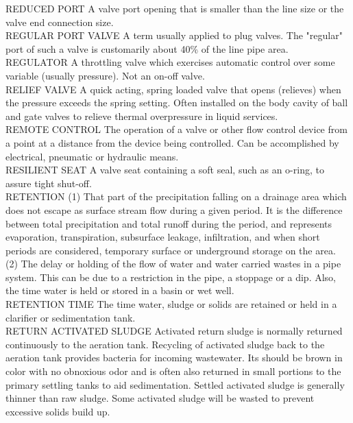 \documentclass{article}
\begin{document}
REDUCED PORT
A valve port opening that is smaller than the line size or the valve end connection size.
\vspace{0.3cm}\\
REGULAR PORT VALVE
A term usually applied to plug valves. The "regular" port of such a valve is customarily about 40\% of the line pipe area.
\vspace{0.3cm}\\
REGULATOR
A throttling valve which exercises automatic control over some variable (usually pressure). Not an on-off valve.
\vspace{0.3cm}\\
RELIEF VALVE
A quick acting, spring loaded valve that opens (relieves) when the pressure exceeds the spring setting. Often installed on the body cavity of ball and gate valves to relieve thermal overpressure in liquid services.
\vspace{0.3cm}\\
REMOTE CONTROL
The operation of a valve or other flow control device from a point at a distance from the device being controlled. Can be accomplished by electrical, pneumatic or hydraulic means.
\vspace{0.3cm}\\
RESILIENT SEAT
A valve seat containing a soft seal, such as an o-ring, to assure tight shut-off.
\vspace{0.3cm}\\
RETENTION
(1) That part of the precipitation falling on a drainage area which does not escape as surface stream flow during a given period. It is the difference between total precipitation and total runoff during the period, and represents evaporation, transpiration, subsurface leakage, infiltration, and when short periods are considered, temporary surface or underground storage on the area. (2) The delay or holding of the flow of water and water carried wastes in a pipe system. This can be due to a restriction in the pipe, a stoppage or a dip. Also, the time water is held or stored in a basin or wet well. 
\vspace{0.3cm}\\
RETENTION TIME
The time water, sludge or solids are retained or held in a clarifier or sedimentation tank.
\vspace{0.3cm}\\
RETURN ACTIVATED SLUDGE
Activated return sludge is normally returned continuously to the aeration tank. Recycling of activated sludge back to the aeration tank provides bacteria for incoming wastewater. Its should be brown in color with no obnoxious odor and is often also returned in small portions to the primary settling tanks to aid sedimentation. Settled activated sludge is generally thinner than raw sludge. Some activated sludge will be wasted to prevent excessive solids build up.
\end{document}
